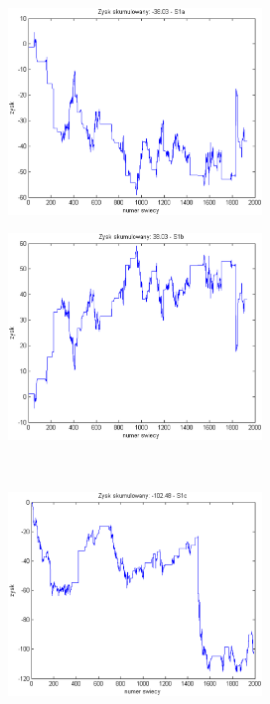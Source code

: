\documentclass{tewiart}
\begin{document}
\FloatBarrier
\begin{figure}[h]
\centering
\begin{minipage}{\linewidth}
\centering
\includegraphics[width=0.6\textwidth]{images/fcornS1a.eps}
\label{jedno}
\end{minipage}
\begin{minipage}{\linewidth}
\centering
\includegraphics[width=0.6\textwidth]{images/fcornS1b.eps}
\label{dwu}
\end{minipage}
\\
\begin{minipage}{\linewidth}
\centering
\includegraphics[width=0.6\textwidth]{images/fcornS1c.eps}

\end{minipage}
\end{figure}
\end{document}
